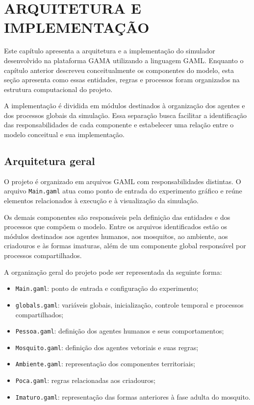 \chapter{ARQUITETURA E IMPLEMENTAÇÃO}

Este capítulo apresenta a arquitetura e a implementação do simulador desenvolvido na plataforma GAMA utilizando a linguagem GAML. Enquanto o capítulo anterior descreveu conceitualmente os componentes do modelo, esta seção apresenta como essas entidades, regras e processos foram organizados na estrutura computacional do projeto.

A implementação é dividida em módulos destinados à organização dos agentes e dos processos globais da simulação. Essa separação busca facilitar a identificação das responsabilidades de cada componente e estabelecer uma relação entre o modelo conceitual e sua implementação.

\section{Arquitetura geral}

O projeto é organizado em arquivos GAML com responsabilidades distintas. O arquivo \texttt{Main.gaml} atua como ponto de entrada do experimento gráfico e reúne elementos relacionados à execução e à visualização da simulação.

Os demais componentes são responsáveis pela definição das entidades e dos processos que compõem o modelo. Entre os arquivos identificados estão os módulos destinados aos agentes humanos, aos mosquitos, ao ambiente, aos criadouros e às formas imaturas, além de um componente global responsável por processos compartilhados.

A organização geral do projeto pode ser representada da seguinte forma:

\begin{itemize}
    \item \texttt{Main.gaml}: ponto de entrada e configuração do experimento;
    \item \texttt{globals.gaml}: variáveis globais, inicialização, controle temporal e processos compartilhados;
    \item \texttt{Pessoa.gaml}: definição dos agentes humanos e seus comportamentos;
    \item \texttt{Mosquito.gaml}: definição dos agentes vetoriais e suas regras;
    \item \texttt{Ambiente.gaml}: representação dos componentes territoriais;
    \item \texttt{Poca.gaml}: regras relacionadas aos criadouros;
    \item \texttt{Imaturo.gaml}: representação das formas anteriores à fase adulta do mosquito.
\end{itemize}

